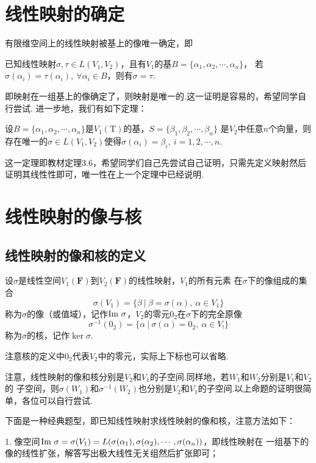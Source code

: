 \section{线性映射的确定}
有限维空间上的线性映射被基上的像唯一确定，即
\begin{theorem}
	已知线性映射$\sigma,\tau\in L(V_1,V_2)$，且有$V_1$的基$B=\{\alpha_1,\alpha_2,\cdots,\alpha_n\}$，
	若$\sigma(\alpha_i)=\tau(\alpha_i),\ \forall \alpha_i \in B$，则有$\sigma=\tau$.
\end{theorem}
即映射在一组基上的像确定了，则映射是唯一的.这一证明是容易的，希望同学自行尝试.
进一步地，我们有如下定理：
\begin{theorem}
	设$B=\{\alpha_1,\alpha_2,\cdots,\alpha_n\}$是$V_1(\mathrm{T})$的基，$S=\{\beta_1,\beta_2,\cdots,\beta_n\}$
	是$V_2$中任意$n$个向量，则存在唯一的$\sigma\in L(V_1,V_2)$使得$\sigma(\alpha_i)=\beta_i,\ i=1,2,\cdots,n$.
\end{theorem}
这一定理即教材定理3.6，希望同学们自己先尝试自己证明，只需先定义映射然后证明其线性性即可，唯一性在上一个定理中已经说明.

\section{线性映射的像与核}
\subsection{线性映射的像和核的定义}
\begin{definition}
	设$\sigma$是线性空间$V_1(\mathbf{F})$到$V_2(\mathbf{F})$的线性映射，$V_1$的所有元素
	在$\sigma$下的像组成的集合
	$$\sigma(V_1)=\{\beta\ |\ \beta=\sigma(\alpha),\ \alpha \in V_1\}$$
	称为$\sigma$的像（或值域），记作$\textup{Im }\sigma$，$V_2$的零元$0_2$在$\sigma$下的完全原像
	$$\sigma^{-1}(0_2)=\{\alpha\ |\ \sigma(\alpha)=0_2,\ \alpha \in V_!\}$$
	称为$\sigma$的核，记作$\ker \sigma$.
\end{definition}
注意核的定义中$0_2$代表$V_2$中的零元，实际上下标也可以省略.

注意，线性映射的像和核分别是$V_2$和$V_1$的子空间.同样地，若$W_1$和$W_2$分别是$V_1$和$V_2$的
子空间，则$\sigma(W_1)$和$\sigma^{-1}(W_2)$也分别是$V_2$和$V_1$的子空间.以上命题的证明很简单，各位可以自行尝试.

下面是一种经典题型，即已知线性映射求线性映射的像和核，注意方法如下：

1. 像空间$\textup{Im }\sigma=\sigma(V_1)=L(\sigma(\alpha_1),\sigma(\alpha_2),\cdots,\sigma(\alpha_n))$，即线性映射在
一组基下的像的线性扩张，解答写出极大线性无关组然后扩张即可；

